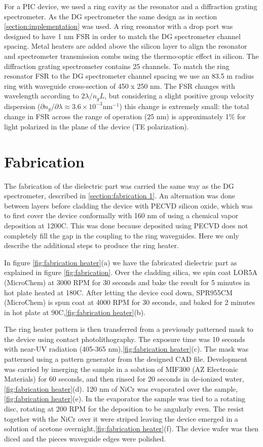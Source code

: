 \documentclass[12pt,twoside,english]{book}
\renewcommand{\~}{\perispomeni}%
\DeclareRobustCommand{\textgreek}[1]{\leavevmode{\greektext #1}}
\numberwithin{equation}{section}
\numberwithin{figure}{section}
\begin{document}
For a PIC device, we used a ring cavity as the resonator and a diffraction grating spectrometer. As the DG spectrometer the same design as in section \ref{section:implementation} was used. A ring resonator with a drop port was designed to have 1 nm FSR in order to match the DG spectrometer channel spacing. Metal heaters are added above the silicon layer to align the resonator and spectrometer transmission combs using the thermo-optic effect in silicon. The diffraction grating spectrometer contains 25 channels. To match the ring resonator FSR to the DG spectrometer channel spacing we use an 83.5 \textgreek{m}m radius ring with waveguide cross-section of 450 x 250 nm. The FSR changes with wavelength according to $2\lambda/n_{g}L$, but considering a slight positive group velocity dispersion ($\partial n_{g}/\partial\lambda\approx3.6\times10^{-3}\text{nm}^{-1}$) this change is extremely small: the total change in FSR across the range of operation (25 nm) is approximately 1\% for light polarized in the plane of the device (TE polarization).

\section{Fabrication}

The fabrication of the dielectric part was carried the same way as the DG spectrometer, described in \ref{section:fabrication 1}. An alternation was done between layers before cladding the device with PECVD silicon oxide, which was to first cover the device conformally with 160 nm of  using a chemical vapor deposition at 1200\textdegree C. This was done because  deposited using PECVD does not completely fill the gap in the coupling to the ring waveguides. Here we only describe the additional steps to produce the ring heater.

In figure \ref{fig:fabrication heater}(a) we have the fabricated dielectric part as explained in figure \ref{fig:fabrication}. Over the cladding silica, we spin coat LOR5A (MicroChem) at 3000 RPM for 30 seconds and bake the result for 5 minutes in hot plate heated at 180\textdegree C. After letting the device cool down, SPR955CM (MicroChem) is spun coat at 4000 RPM for 30 seconds, and baked for 2 minutes in hot plate at 90\textdegree C,\ref{fig:fabrication heater}(b).

The ring heater pattern is then transferred from a previously patterned mask to the device using contact photolithography. The exposure time was 10 seconds with near-UV radiation (405-365 nm),\ref{fig:fabrication heater}(c). The mask was patterned using a pattern generator from the designed CAD file. Development was carried by imerging the sample in a solution of MIF300 (AZ Electronic Materials) for 60 seconds, and then rinsed for 20 seconds in de-ionized water,\ref{fig:fabrication heater}(d). 120 nm of NiCr was evaporated over the sample,\ref{fig:fabrication heater}(e). In the evaporator the sample was tied to a rotating disc, rotating at 200 RPM for the deposition to be angularly even. The resist together with the NiCr over it were striped leaving the device emerged in a solution of acetone overnight,\ref{fig:fabrication heater}(f). The device wafer was then diced and the pieces waveguide edges were polished.
\end{document}
